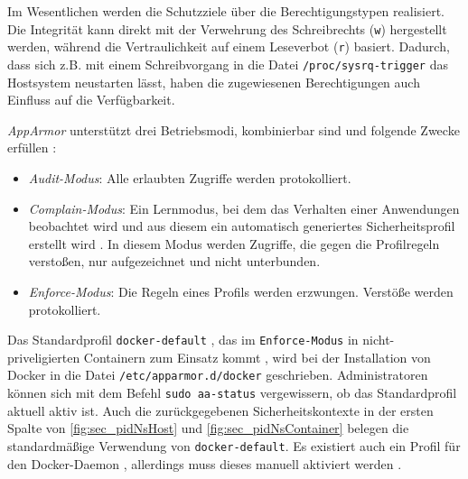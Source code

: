 \documentclass[../main.tex]{subfiles}
\begin{document}
{				Im Wesentlichen werden die Schutzziele über die Berechtigungstypen realisiert. Die Integrität kann direkt mit der Verwehrung des Schreibrechts (\texttt{w}) hergestellt werden, während die Vertraulichkeit auf einem Leseverbot (\texttt{r}) basiert. Dadurch, dass sich z.B. mit einem Schreibvorgang in die Datei \texttt{/proc/sysrq-trigger} das Hostsystem neustarten lässt, haben die zugewiesenen Berechtigungen auch Einfluss auf die Verfügbarkeit.


				\emph{AppArmor} unterstützt drei Betriebsmodi, kombinierbar sind und folgende Zwecke erfüllen \cite[S.82]{SELinuxApparmor}:
				\begin{itemize}
					\item \emph{Audit-Modus}: Alle erlaubten Zugriffe werden protokolliert.
					\item \emph{Complain-Modus}: Ein Lernmodus, bei dem das Verhalten einer Anwendungen beobachtet wird und aus diesem ein automatisch generiertes Sicherheitsprofil erstellt wird \cite{linuxSecOverview}. In diesem Modus werden Zugriffe, die gegen die Profilregeln verstoßen, nur aufgezeichnet und nicht unterbunden.
					\item \emph{Enforce-Modus}: Die Regeln eines Profils werden erzwungen. Verstöße werden protokolliert.
				\end{itemize}


				Das Standardprofil \texttt{docker-default} \cite{githubAppArmorProfileContainer}, das im \texttt{Enforce-Modus} in nicht-priveligierten Containern zum Einsatz kommt \cite{docker110Security}, wird bei der Installation von Docker in die Datei \texttt{/etc/apparmor.d/docker} geschrieben. Administratoren können sich mit dem Befehl \texttt{sudo aa-status} vergewissern, ob das Standardprofil aktuell aktiv ist. Auch die zurückgegebenen Sicherheitskontexte in der ersten Spalte von \fig \ref{fig:sec_pidNsHost} und \fig \ref{fig:sec_pidNsContainer} belegen die standardmäßige Verwendung von \texttt{docker-default}. Es existiert auch ein Profil für den Docker-Daemon \cite{githubAppArmorProfileDaemon}, allerdings muss dieses manuell aktiviert werden \cite{githubAppArmorDoc}.

}
\end{document}
